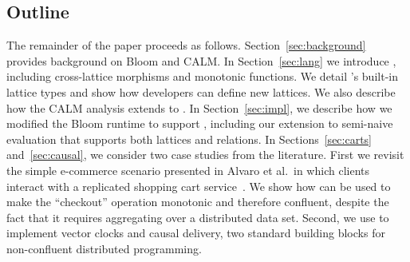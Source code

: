% 

\subsection{Outline}
The remainder of the paper proceeds as follows.  Section~\ref{sec:background}
provides background on Bloom and CALM.  In Section~\ref{sec:lang} we introduce
\lang, including cross-lattice morphisms and monotonic functions. We detail
\lang's built-in lattice types and show how developers can define new lattices.
We also describe how the CALM analysis extends to \lang.  In
Section~\ref{sec:impl}, we describe how we modified the Bloom runtime to support
\lang, including our extension to semi-naive evaluation that supports both
lattices and relations.  In Sections~\ref{sec:carts} and~\ref{sec:causal}, we
consider two case studies from the literature.  First we revisit the simple
e-commerce scenario presented in Alvaro et al.\ in which clients interact with a
replicated shopping cart service~\cite{Alvaro2011}. We show how \lang can be
used to make the ``checkout'' operation monotonic and therefore confluent,
despite the fact that it requires aggregating over a distributed data set.
Second, we use \lang to implement vector clocks and causal delivery, two
standard building blocks for non-confluent distributed programming.

